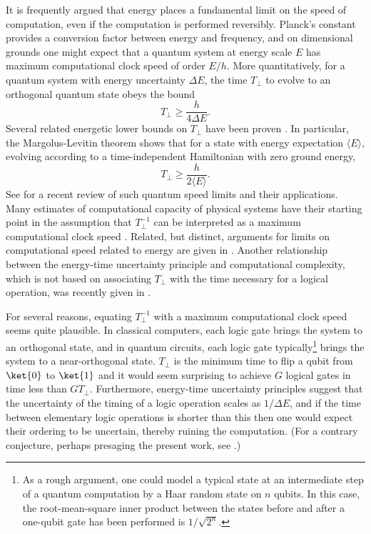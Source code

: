 \documentclass[11pt]{article}
\begin{document}
It is frequently argued that energy places a fundamental limit on the speed of computation, even if the computation is performed reversibly. Planck's constant provides a conversion factor between energy and frequency, and on dimensional grounds one might expect that a quantum system at energy scale $E$ has maximum computational clock speed of order $E/h$. More quantitatively, for a quantum system with energy uncertainty $\Delta E$, the time $T_{\perp}$ to evolve to an orthogonal quantum state obeys the bound \cite{MT45, F73, AA90, V92, U93}
\begin{equation}
T_{\perp} \geq \frac{h}{4 \Delta E}.
\end{equation}
Several related energetic lower bounds on $T_{\perp}$ have been proven \cite{P95, ML98, P93, BCM96, GLM03, LT09}. In particular, the Margolus-Levitin theorem \cite{ML98} shows that for a state with energy expectation $\langle E \rangle$, evolving according to a time-independent Hamiltonian with zero ground energy,
\begin{equation}
T_{\perp} \geq \frac{h}{2 \langle E \rangle}.
\end{equation}
See \cite{Frey16} for a recent review of such quantum speed limits and their applications. Many estimates of computational capacity of physical systems have their starting point in the assumption that $T_{\perp}^{-1}$ can be interpreted as a maximum computational clock speed \cite{Lloyd00, M14, LN07, L02, F02, LT09, M03, BRSSZ16a, BRSSZ16b, Hsu06, Hsu07, GPP06, Frank05, Ng08}. Related, but distinct, arguments for limits on computational speed related to energy are given in \cite{B62, B82, B81, L82}. Another relationship between the energy-time uncertainty principle and computational complexity, which is not based on associating $T_{\perp}$ with the time necessary for a logical operation, was recently given in \cite{AA16}.

For several reasons, equating $T_{\perp}^{-1}$ with a maximum computational clock speed seems quite plausible. In classical computers, each logic gate brings the system to an orthogonal state, and in quantum circuits, each logic gate typically\footnote{As a rough argument, one could model a typical state at an intermediate step of a quantum computation by a Haar random state on $n$ qubits. In this case, the root-mean-square inner product between the states before and after a one-qubit gate has been performed is $1/\sqrt{2^n}$.} brings the system to a near-orthogonal state. $T_{\perp}$ is the minimum time to flip a qubit from $\ket{0}$ to $\ket{1}$ and it would seem surprising to achieve $G$ logical gates in time less than $G T_{\perp}$. Furthermore, energy-time uncertainty principles suggest that the uncertainty of the timing of a logic operation scales as $1/\Delta E$, and if the time between elementary logic operations is shorter than this then one would expect their ordering to be uncertain, thereby ruining the computation. (For a contrary conjecture, perhaps presaging the present work, see \cite{BL85}.) 
\end{document}
